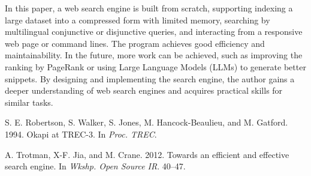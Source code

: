 \documentclass[12pt]{article}
\begin{document}
In this paper, a web search engine is built from scratch, supporting
indexing a large dataset into a compressed form with limited memory,
searching by multilingual conjunctive or disjunctive queries, and
interacting from a responsive web page or command lines. The program
achieves good efficiency and maintainability. In the future, more work
can be achieved, such as improving the ranking by PageRank or using
Large Language Models (LLMs) to generate better snippets. By designing
and implementing the search engine, the author gains a deeper
understanding of web search engines and acquires practical skills for
similar tasks.

\begin{thebibliography}{99}

S. E. Robertson, S. Walker, S. Jones, M. Hancock-Beaulieu, and
M. Gatford. 1994. Okapi at TREC-3. In \emph{Proc. TREC}.

A. Trotman, X-F. Jia, and M. Crane. 2012. Towards an efficient
and effective search engine. In \emph{Wkshp. Open Source IR}. 40--47.

\end{thebibliography}
\end{document}
